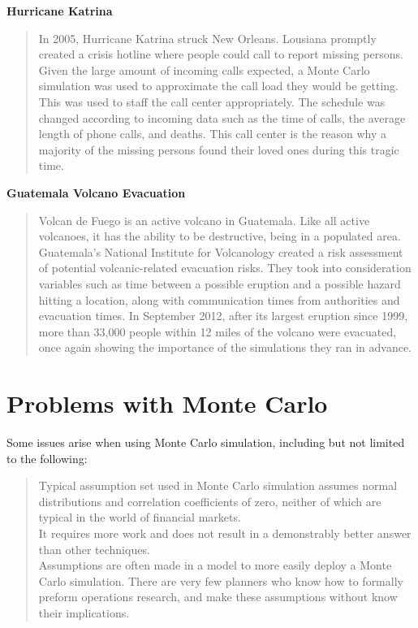 \documentclass{article}
\begin{document}
\textbf{Hurricane Katrina}

\begin{quote}
In 2005, Hurricane Katrina struck New Orleans. Lousiana promptly created a crisis hotline where people could call to report missing persons. Given the large amount of incoming calls expected, a Monte Carlo simulation was used to approximate the call load they would be getting. This was used to staff the call center appropriately. The schedule was changed according to incoming data such as the time of calls, the average length of phone calls, and deaths. This call center is the reason why a majority of the missing persons found their loved ones during this tragic time.
\end{quote}

\textbf{Guatemala Volcano Evacuation}

\begin{quote}
Volcan de Fuego is an active volcano in Guatemala. Like all active volcanoes, it has the ability to be destructive, being in a populated area. Guatemala’s National Institute for Volcanology created a risk assessment of potential volcanic-related evacuation risks. They took into consideration variables such as time between a possible eruption and a possible hazard hitting a location, along with communication times from authorities and evacuation times. In September 2012, after its largest eruption since 1999, more than 33,000 people within 12 miles of the volcano were evacuated, once again showing the importance of the simulations they ran in advance.
\end{quote}

\pagebreak

\section{Problems with Monte Carlo}

Some issues arise when using Monte Carlo simulation, including but not limited to the following:

\begin{quote}
Typical assumption set used in Monte Carlo simulation assumes normal distributions and correlation coefficients of zero, neither of which are typical in the world of financial markets. \\

It requires more work and does not result in a demonstrably better answer than other techniques. \\

Assumptions are often made in a model to more easily deploy a Monte Carlo simulation. There are very few planners who know how to formally preform operations research, and make these assumptions without know their implications.
\end{quote}
\end{document}
